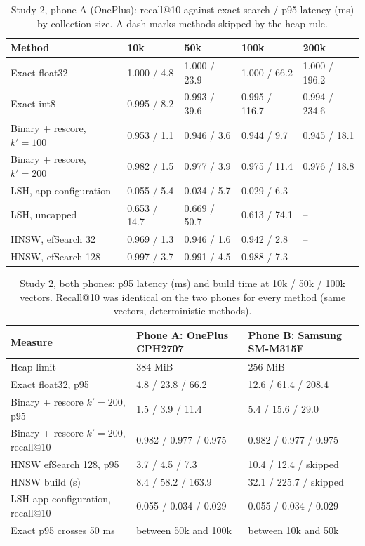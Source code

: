 \documentclass[11pt,a4paper]{article}
\begin{document}
\begin{table}[tbp]
\centering\small
\caption{Study 2, phone A (OnePlus): recall@10 against exact search / p95 latency (ms) by collection size. A dash marks methods skipped by the heap rule.}
\label{tab:scaling}
\begin{tabular}{lllll}
\toprule
Method & 10k & 50k & 100k & 200k \\
\midrule
Exact float32 & 1.000 / 4.8 & 1.000 / 23.9 & 1.000 / 66.2 & 1.000 / 196.2 \\
Exact int8 & 0.995 / 8.2 & 0.993 / 39.6 & 0.995 / 116.7 & 0.994 / 234.6 \\
Binary + rescore, $k'=100$ & 0.953 / 1.1 & 0.946 / 3.6 & 0.944 / 9.7 & 0.945 / 18.1 \\
Binary + rescore, $k'=200$ & 0.982 / 1.5 & 0.977 / 3.9 & 0.975 / 11.4 & 0.976 / 18.8 \\
LSH, app configuration & 0.055 / 5.4 & 0.034 / 5.7 & 0.029 / 6.3 & -- \\
LSH, uncapped & 0.653 / 14.7 & 0.669 / 50.7 & 0.613 / 74.1 & -- \\
HNSW, efSearch 32 & 0.969 / 1.3 & 0.946 / 1.6 & 0.942 / 2.8 & -- \\
HNSW, efSearch 128 & 0.997 / 3.7 & 0.991 / 4.5 & 0.988 / 7.3 & -- \\
\bottomrule
\end{tabular}
\end{table}

\begin{table}[tbp]
\centering\small
\caption{Study 2, both phones: p95 latency (ms) and build time at 10k / 50k / 100k vectors. Recall@10 was identical on the two phones for every method (same vectors, deterministic methods).}
\label{tab:devices}
\begin{tabular}{lll}
\toprule
Measure & Phone A: OnePlus CPH2707 & Phone B: Samsung SM-M315F \\
\midrule
Heap limit & 384 MiB & 256 MiB \\
Exact float32, p95 & 4.8 / 23.8 / 66.2 & 12.6 / 61.4 / 208.4 \\
Binary + rescore $k'=200$, p95 & 1.5 / 3.9 / 11.4 & 5.4 / 15.6 / 29.0 \\
Binary + rescore $k'=200$, recall@10 & 0.982 / 0.977 / 0.975 & 0.982 / 0.977 / 0.975 \\
HNSW efSearch 128, p95 & 3.7 / 4.5 / 7.3 & 10.4 / 12.4 / skipped \\
HNSW build (s) & 8.4 / 58.2 / 163.9 & 32.1 / 225.7 / skipped \\
LSH app configuration, recall@10 & 0.055 / 0.034 / 0.029 & 0.055 / 0.034 / 0.029 \\
Exact p95 crosses 50 ms & between 50k and 100k & between 10k and 50k \\
\bottomrule
\end{tabular}
\end{table}
\end{document}
